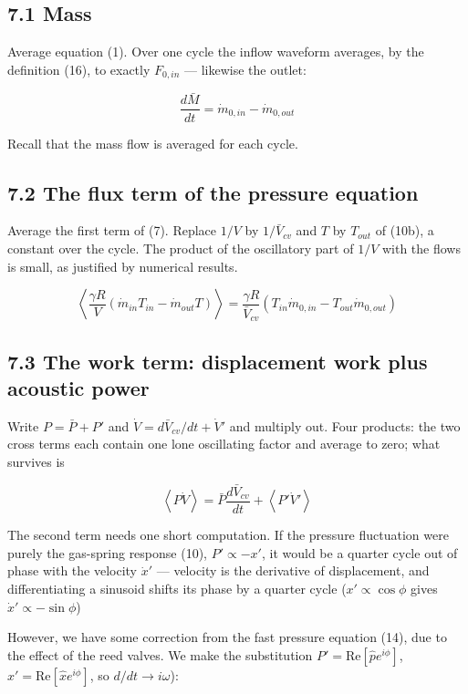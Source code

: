 \documentclass[11pt]{article}
\begin{document}
\subsection*{7.1 Mass}

Average equation (1). Over one cycle the inflow waveform averages, by the definition (16), to exactly $F_{0,in}$ --- likewise the outlet:

\begin{equation}
\frac{d\bar M}{dt} = \dot m_{0,in} - \dot m_{0,out} \tag{23}
\end{equation}

Recall that the mass flow is averaged for each cycle.

\subsection*{7.2 The flux term of the pressure equation}

Average the first term of (7). Replace $1/V$ by $1/\bar V_{cv}$ and $T$ by $T_{out}$ of (10b), a constant over the cycle. The product of the oscillatory part of $1/V$ with the flows is small, as justified by numerical results.

\[
\left\langle\frac{\gamma R}{V}\left(\dot m_{in}T_{in} - \dot m_{out}T\right)\right\rangle = \frac{\gamma R}{\bar V_{cv}}\left(T_{in}\dot m_{0,in} - T_{out}\dot m_{0,out}\right)
\]

\subsection*{7.3 The work term: displacement work plus acoustic power}

Write $P = \bar P + P'$ and $\dot V = d\bar V_{cv}/dt + \dot V'$ and multiply out. Four products: the two cross terms each contain one lone oscillating factor and average to zero; what survives is

\[
\left\langle P\dot V\right\rangle = \bar P\frac{d\bar V_{cv}}{dt} + \left\langle P'\dot V'\right\rangle
\]

The second term needs one short computation. If the pressure fluctuation were purely the gas-spring response (10), $P' \propto -x'$, it would be a quarter cycle out of phase with the velocity $\dot x'$ --- velocity is the derivative of displacement, and differentiating a sinusoid shifts its phase by a quarter cycle ($x' \propto \cos\phi$ gives $\dot x' \propto -\sin\phi$)

However, we have some correction from the fast pressure equation (14), due to the effect of the reed valves. We make the substitution $P' = \mathrm{Re}[\hat pe^{i\phi}]$, $x' = \mathrm{Re}[\hat xe^{i\phi}]$, so $d/dt \to i\omega$):
\end{document}
